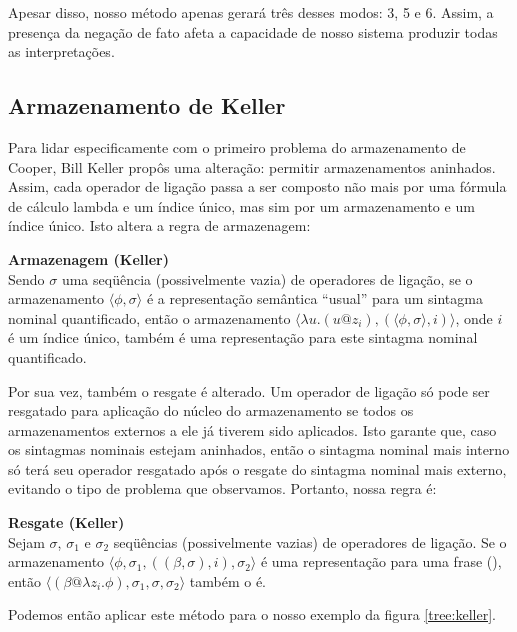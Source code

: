 Apesar disso, nosso método apenas gerará três desses modos: 3, 5 e 6. Assim, a presença da negação de fato afeta a capacidade de nosso sistema produzir todas as interpretações.

\subsection{Armazenamento de Keller}
Para lidar especificamente com o primeiro problema do armazenamento de Cooper, Bill Keller propôs uma alteração: permitir armazenamentos aninhados. Assim, cada operador de ligação passa a ser composto não mais por uma fórmula de cálculo lambda e um índice único, mas sim por um armazenamento e um índice único. Isto altera a regra de armazenagem:

\begin{oframed}\textbf{Armazenagem (Keller)}\\
Sendo $\sigma$ uma seqüência (possivelmente vazia) de operadores de ligação, se o armazenamento $\langle\phi, \sigma\rangle$ é a representação semântica ``usual'' para um sintagma nominal quantificado, então o armazenamento $\langle\lambda u.(u@z_i), (\langle \phi, \sigma \rangle, i) \rangle $, onde $i$ é um índice único, também é uma representação para este sintagma nominal quantificado.
\end{oframed}

Por sua vez, também o resgate é alterado. Um operador de ligação só pode ser resgatado para aplicação do núcleo do armazenamento se todos os armazenamentos externos a ele já tiverem sido aplicados. Isto garante que, caso os sintagmas nominais estejam aninhados, então o sintagma nominal mais interno só terá seu operador resgatado após o resgate do sintagma nominal mais externo, evitando o tipo de problema que observamos. Portanto, nossa regra é:

\begin{oframed}\textbf{Resgate (Keller)}\\
Sejam $\sigma$, $\sigma_1$ e $\sigma_2$ seqüências (possivelmente vazias) de operadores de ligação. Se o armazenamento $\langle \phi, \sigma_1, ((\beta, \sigma), i), \sigma_2 \rangle$ é uma representação para uma frase (), então $\langle (\beta @ \lambda z_i . \phi ), \sigma_1, \sigma, \sigma_2 \rangle$ também o é.
\end{oframed}

Podemos então aplicar este método para o nosso exemplo da figura \ref{tree:keller}.

